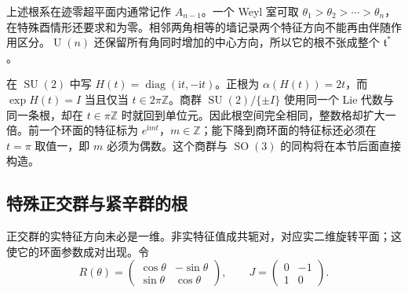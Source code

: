 上述根系在迹零超平面内通常记作 \(A_{n-1}\)。一个 Weyl 室可取 \(\theta_1>\theta_2>\cdots>\theta_n\)，在特殊酉情形还要求和为零。相邻两角相等的墙记录两个特征方向不能再由伴随作用区分。\(\operatorname{U}(n)\) 还保留所有角同时增加的中心方向，所以它的根不张成整个 \(\mathfrak t^*\)。

\begin{example}\label{g1:exm:su2-so3-lattices}
	在 \(\operatorname{SU}(2)\) 中写 \(H(t)=\operatorname{diag}(\mathrm{i}t,-\mathrm{i}t)\)。正根为 \(\alpha(H(t))=2t\)，而 \(\exp H(t)=I\) 当且仅当 \(t\in2\pi\mathbb Z\)。商群 \(\operatorname{SU}(2)/\{\pm I\}\) 使用同一个 Lie 代数与同一条根，却在 \(t\in\pi\mathbb Z\) 时就回到单位元。因此根空间完全相同，整数格却扩大一倍。前一个环面的特征标为 \(e^{\mathrm{i}mt}\)，\(m\in\mathbb Z\)；能下降到商环面的特征标还必须在 \(t=\pi\) 取值一，即 \(m\) 必须为偶数。这个商群与 \(\operatorname{SO}(3)\) 的同构将在本节后面直接构造。
\end{example}

\subsection{特殊正交群与紧辛群的根}
\label{g1:subsec:1905:02}
正交群的实特征方向未必是一维。非实特征值成共轭对，对应实二维旋转平面；这使它的环面参数成对出现。令
\[
	R(\theta)=\begin{pmatrix}\cos\theta&-\sin\theta\\\sin\theta&\cos\theta\end{pmatrix},\qquad
	J=\begin{pmatrix}0&-1\\1&0\end{pmatrix}.
\]

